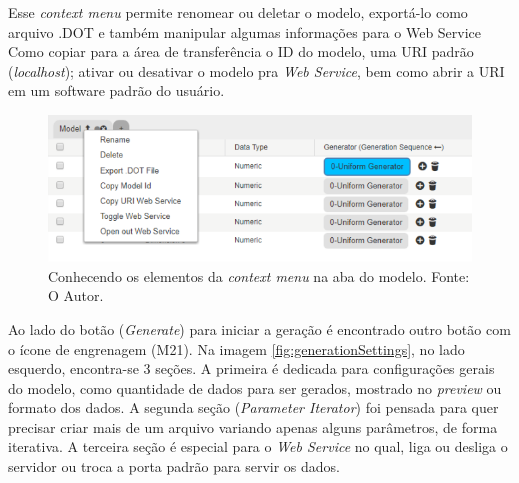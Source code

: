 \documentclass[
	12pt,				%
	openright,			%
	twoside,			%
	a4paper,			%
	english,			%
	brazil				%
	]{abntex2}
\begin{document}
		Esse \emph{context menu} permite renomear ou deletar o modelo, exportá-lo como arquivo .DOT e também manipular algumas informações para o Web Service Como
			copiar para a área de transferência o ID do modelo, uma URI padrão (\emph{localhost}); ativar ou desativar o modelo pra \emph{Web Service}, bem como abrir a URI em um software padrão do usuário.
		\begin{figure}[h]
			\centering
			\includegraphics[width=\linewidth]{./figures/prototipo/contextMenu.png}
			\caption{Conhecendo os elementos da \emph{context menu} na aba do modelo. Fonte: O Autor.}
			\label{fig:contextMenu}
		\end{figure}
		\par
		Ao lado do botão (\emph{Generate}) para iniciar a geração é encontrado outro botão com o ícone de engrenagem (M21).
		Na imagem \ref{fig:generationSettings}, no lado esquerdo, encontra-se 3 seções.
		A primeira é dedicada para configurações gerais do modelo, como quantidade de dados para ser gerados, mostrado no \emph{preview} ou formato dos dados.
		A segunda seção (\emph{Parameter Iterator}) foi pensada para quer precisar criar mais de um arquivo variando apenas alguns parâmetros, de forma iterativa.
		A terceira seção é especial para o \emph{Web Service} no qual, liga ou desliga o servidor ou troca a porta padrão para servir os dados.
\end{document}
